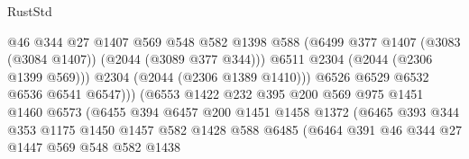 \begin{lexlean}{RustStd}
\begin{coremodule}
                                      @46
                                      @344
                                      @27
                                      @1407
                                      @569
                                      @548
                                      @582
                                      @1398
                                      @588
                                      (@6499
                                        @377
                                        @1407
                                        (@3083 (@3084 @1407))
                                        (@2044 (@3089 @377 @344)))
                                      @6511
                                      @2304
                                      (@2044 (@2306 @1399 @569)))
                                    @2304
                                    (@2044 (@2306 @1389 @1410)))
                                  @6526
                                  @6529
                                  @6532
                                  @6536
                                  @6541
                                  @6547)))
                            (@6553
                              @1422
                              @232
                              @395
                              @200
                              @569
                              @975
                              @1451
                              @1460
                              @6573
                              (@6455
                                @394
                                @6457
                                @200
                                @1451
                                @1458
                                @1372
                                (@6465
                                  @393
                                  @344
                                  @353
                                  @1175
                                  @1450
                                  @1457
                                  @582
                                  @1428
                                  @588
                                  @6485
                                  (@6464
                                    @391
                                    @46
                                    @344
                                    @27
                                    @1447
                                    @569
                                    @548
                                    @582
                                    @1438

\end{coremodule}
\end{lexlean}
